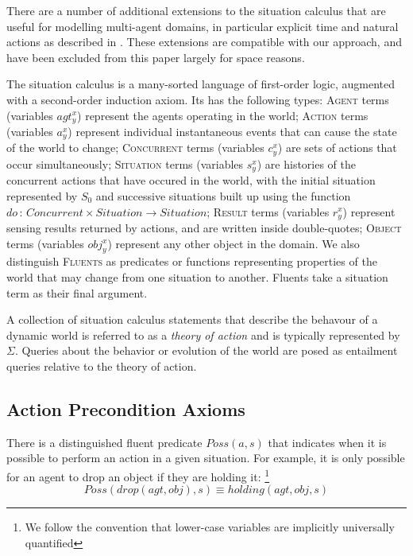 \documentclass[letterpaper]{article}
\newcommand{\noun}[1]{\textsc{#1}}
\begin{document}
There are a number of additional extensions to the situation calculus
that are useful for modelling multi-agent domains, in particular explicit
time and natural actions as described in \cite{reiter96sc_nat_conc}.
These extensions are compatible with our approach, and have been excluded
from this paper largely for space reasons.

The situation calculus is a many-sorted language of first-order logic,
augmented with a second-order induction axiom. Its has the following
types: \noun{Agent} terms (variables $agt_{y}^{x}$) represent the
agents operating in the world; \noun{Action} terms (variables $a_{y}^{x}$)
represent individual instantaneous events that can cause the state
of the world to change; \noun{Concurrent} terms (variables $c_{y}^{x}$)
are sets of actions that occur simultaneously; \noun{Situation} terms
(variables $s_{y}^{x}$) are histories of the concurrent actions that
have occured in the world, with the initial situation represented
by $S_{0}$ and successive situations built up using the function
$do\,:\, Concurrent\times Situation\rightarrow Situation$; \noun{Result}
terms (variables $r_{y}^{x}$) represent sensing results returned
by actions, and are written inside double-quotes; \noun{Object} terms
(variables $obj_{y}^{x}$) represent any other object in the domain.
We also distinguish \noun{Fluents} as predicates or functions representing
properties of the world that may change from one situation to another.
Fluents take a situation term as their final argument.

A collection of situation calculus statements that describe the behavour
of a dynamic world is referred to as a \emph{theory of action} and
is typically represented by $\Sigma$. Queries about the behavior
or evolution of the world are posed as entailment queries relative
to the theory of action.


\subsection{Action Precondition Axioms}

There is a distinguished fluent predicate $Poss(a,s)$ that indicates
when it is possible to perform an action in a given situation. For
example, it is only possible for an agent to drop an object if they
are holding it:
\footnote{We follow the convention that lower-case variables are implicitly
universally quantified
}
\begin{equation}
Poss(drop(agt,obj),s) \equiv holding(agt,obj,s)
\end{equation}
\end{document}
